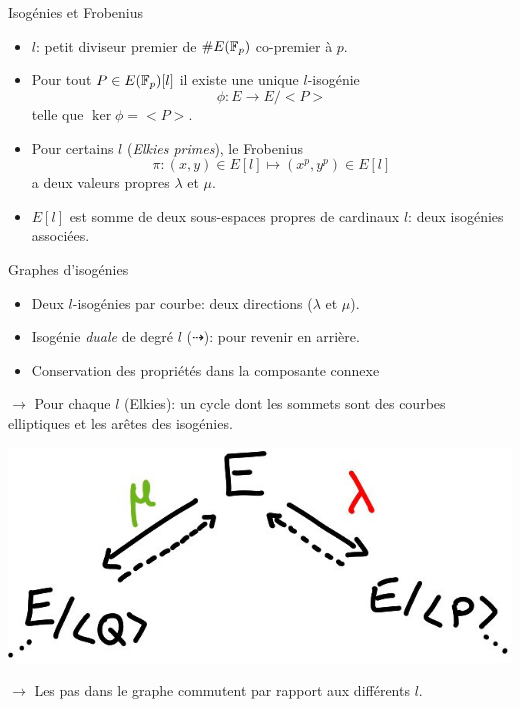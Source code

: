 \documentclass{beamer}
\begin{document}
\begin{frame}{Isog\'enies et Frobenius}
	\begin{itemize}
		\item  $l$: petit diviseur premier de $\#E(\mathbb{F}_p)$ co-premier \`a $p$.
		\item Pour  tout $P\in E(\mathbb{F}_p)[l]$ il existe une unique $l$-isog\'enie
	\[
		\phi: E\rightarrow E/<P>
	\]
	telle que $\ker\phi = <P>$.
\item Pour certains $l$ (\textit{Elkies primes}), le Frobenius
		\[
			\pi: (x, y)\in E[l]\mapsto (x^p, y^p)\in E[l]
		\]
	a deux valeurs propres $\lambda$ et $\mu$.
\item $E[l]$ est somme de deux sous-espaces propres de cardinaux $l$: deux isog\'enies associ\'ees.
	\end{itemize}
\end{frame}

\begin{frame}{Graphes d'isog\'enies}
	\begin{itemize}
		\item Deux $l$-isog\'enies par courbe: deux directions ($\lambda$ et $\mu$).
		\item Isog\'enie \textit{duale} de degr\'e $l$ ($\dashrightarrow$): pour revenir en arri\`ere.
		\item Conservation des propri\'et\'es dans la composante connexe
	\end{itemize}
	 \vspace*{0.2cm}
	$\rightarrow$ Pour chaque $l$ (Elkies): un cycle dont les sommets sont des courbes elliptiques et les ar\^etes des isog\'enies.
	 \vspace*{0.2cm}
	\begin{center}
		\includegraphics[scale=0.2]{../figs/Cycle}
	\end{center}
	$\rightarrow$ Les pas dans le graphe commutent par rapport aux différents $l$.
\end{frame}
\end{document}
